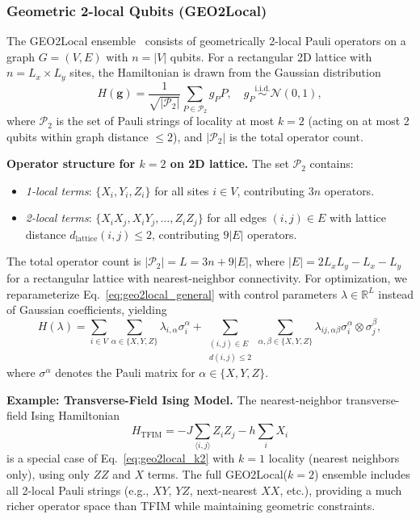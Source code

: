 \documentclass[aps,prx,reprint,superscriptaddress,footnote, twocolumn,notitlepage]{revtex4-2}
\begin{document}
 \subsubsection{Geometric 2-local Qubits (GEO2Local)} \label{sec:geo2}
The GEO2Local ensemble~\cite{https://arxiv.org/html/2510.06321v1} consists of geometrically 2-local Pauli operators on a graph $G = (V, E)$ with $n = |V|$ qubits. For a rectangular 2D lattice with $n = L_x \times L_y$ sites, the Hamiltonian is drawn from the Gaussian distribution
\begin{equation}
H(\mathbf{g}) = \frac{1}{\sqrt{|\mathcal{P}_2|}} \sum_{P \in \mathcal{P}_2} g_P P, \quad g_P \stackrel{\text{i.i.d.}}{\sim} \mathcal{N}(0, 1),
\label{eq:geo2local_general}
\end{equation}
where $\mathcal{P}_2$ is the set of Pauli strings of locality at most $k=2$ (acting on at most 2 qubits within graph distance $\leq 2$), and $|\mathcal{P}_2|$ is the total operator count.

\textbf{Operator structure for $k=2$ on 2D lattice.} The set $\mathcal{P}_2$ contains:
\begin{itemize}[leftmargin=1.5em]
\item \emph{1-local terms}: $\{X_i, Y_i, Z_i\}$ for all sites $i \in V$, contributing $3n$ operators.
\item \emph{2-local terms}: $\{X_i X_j, X_i Y_j, \ldots, Z_i Z_j\}$ for all edges $(i,j) \in E$ with lattice distance $d_{\text{lattice}}(i,j) \leq 2$, contributing $9|E|$ operators.
\end{itemize}
The total operator count is $|\mathcal{P}_2| = L = 3n + 9|E|$, where $|E| = 2L_x L_y - L_x - L_y$ for a rectangular lattice with nearest-neighbor connectivity. For optimization, we reparameterize Eq.~\eqref{eq:geo2local_general} with control parameters $\lambda \in \mathbb{R}^L$ instead of Gaussian coefficients, yielding
\begin{equation}
H(\lambda) = \sum_{i \in V} \sum_{\alpha \in \{X,Y,Z\}} \lambda_{i,\alpha} \sigma_i^\alpha
           + \sum_{\substack{(i,j) \in E \\ d(i,j) \leq 2}} \sum_{\alpha,\beta \in \{X,Y,Z\}} \lambda_{ij,\alpha\beta}
             \sigma_i^\alpha \otimes \sigma_j^\beta,
\label{eq:geo2local_k2}
\end{equation}
where $\sigma^\alpha$ denotes the Pauli matrix for $\alpha \in \{X, Y, Z\}$.

\textbf{Example: Transverse-Field Ising Model.} The nearest-neighbor transverse-field Ising Hamiltonian
\begin{equation}
H_{\text{TFIM}} = -J \sum_{\langle i,j \rangle} Z_i Z_j - h \sum_i X_i
\end{equation}
is a special case of Eq.~\eqref{eq:geo2local_k2} with $k=1$ locality (nearest neighbors only), using only $ZZ$ and $X$ terms. The full GEO2Local($k=2$) ensemble includes all 2-local Pauli strings (e.g., $XY$, $YZ$, next-nearest $XX$, etc.), providing a much richer operator space than TFIM while maintaining geometric constraints.
\end{document}
